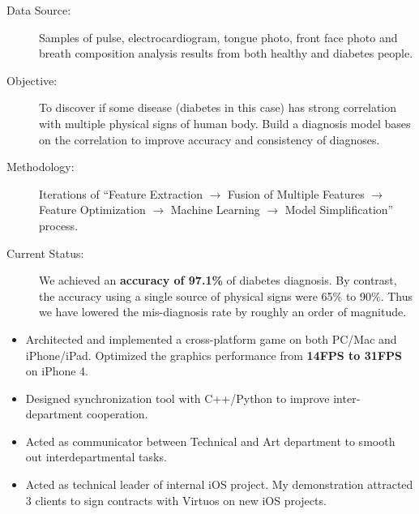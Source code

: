 \documentclass[11pt,a4paper]{moderncv/moderncv}
\begin{document}
{
\begin{description}
	\item[Data Source:] Samples of pulse, electrocardiogram, tongue photo, front face photo and breath composition analysis results from both healthy and diabetes people.
	\item[Objective:] To discover if some disease (diabetes in this case) has strong correlation with multiple physical signs of human body. Build a diagnosis model bases on the correlation to improve accuracy and consistency of diagnoses.
	\item[Methodology:] Iterations of ``Feature Extraction $\rightarrow$ Fusion of Multiple Features $\rightarrow$ Feature Optimization $\rightarrow$ Machine Learning $\rightarrow$ Model Simplification'' process.
	\item[Current Status:]  We achieved an \textbf{accuracy of 97.1\%} of diabetes diagnosis. By contrast, the accuracy using a single source of physical signs were 65\% to 90\%. Thus we have lowered the mis-diagnosis rate by roughly an order of magnitude.
\end{description}
}

{
\begin{itemize}
	\item Architected and implemented a cross-platform game on both PC/Mac and iPhone/iPad. Optimized the graphics performance from \textbf{14FPS to 31FPS} on iPhone 4.
	\item Designed synchronization tool with C++/Python to improve inter-department cooperation.
	\item Acted as communicator between Technical and Art department to smooth out interdepartmental tasks.
	\item Acted as technical leader of internal iOS project. My demonstration attracted 3 clients to sign contracts with Virtuos on new iOS projects.
\end{itemize}
}

\end{document}
